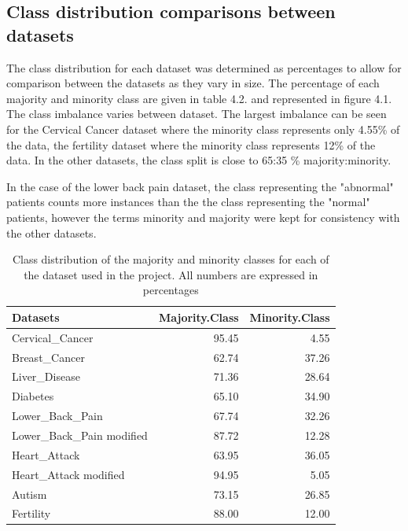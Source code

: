 \subsection{Class distribution comparisons between datasets}
The class distribution for each dataset was determined as percentages to allow for comparison between the datasets as they vary in size. 
The percentage of each majority and minority class are given in table 4.2. and represented in figure 4.1.
The class imbalance varies between dataset. The largest imbalance can be seen for the Cervical Cancer dataset where the minority class represents only 4.55\% of the data, the fertility dataset where the minority class represents 12\% of the data. In the other datasets, the class split is close to 65:35 \% majority:minority.

In the case of the lower back pain dataset, the class representing the "abnormal" patients counts more instances than the the class representing the "normal" patients, however the terms minority and majority were kept for consistency with the other datasets.


\newline
\begin{table}[!htbp]
\centering
\begin{tabular}{lrr}
  \hline
  \rowcolor{LightCyan}
Datasets & Majority.Class & Minority.Class \\ 
  \hline
Cervical\_Cancer & 95.45 & 4.55 \\ 
  Breast\_Cancer & 62.74 & 37.26 \\ 
  Liver\_Disease & 71.36 & 28.64 \\ 
  Diabetes & 65.10 & 34.90 \\ 
  Lower\_Back\_Pain & 67.74 & 32.26 \\ 
  Lower\_Back\_Pain modified & 87.72 & 12.28 \\ 
  Heart\_Attack & 63.95 & 36.05 \\ 
  Heart\_Attack modified & 94.95 & 5.05 \\ 
  Autism & 73.15 & 26.85 \\ 
  Fertility & 88.00 & 12.00 \\ 
   \hline
\end{tabular}
\caption{Class distribution of the majority and minority classes for each of the dataset used in the project. All numbers are expressed in percentages}
\end{table}

